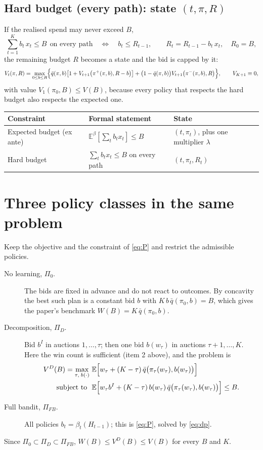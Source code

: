 \documentclass[11pt]{article}
\newcommand{\E}{\mathbb{E}}
\newcommand{\qbar}{\bar q}
\theoremstyle{remark}
\begin{document}
\subsection{Hard budget (every path): state $(t,\pi,R)$}

If the realised spend may never exceed $B$,
\[
\sum_{t=1}^Kb_t\,x_t\le B\ \ \text{on every path}
\quad\Longleftrightarrow\quad
b_t\le R_{t-1},\qquad R_t=R_{t-1}-b_t\,x_t,\quad R_0=B,
\]
the remaining budget $R$ becomes a state and the bid is capped by it:
\begin{equation}\label{eq:hard}
V_t(\pi,R)=\max_{0\le b\le R}\Bigl\{\qbar(\pi,b)\bigl[1+V_{t+1}\bigl(\pi^{+}(\pi,b),R-b\bigr)\bigr]
+\bigl(1-\qbar(\pi,b)\bigr)V_{t+1}\bigl(\pi^{-}(\pi,b),R\bigr)\Bigr\},\qquad V_{K+1}\equiv0,
\end{equation}
with value $V_1(\pi_0,B)\le V(B)$, because every policy that respects the hard budget also respects the expected one.

\begin{table}[h]
\centering\small
\begin{tabular}{@{}lll@{}}
\toprule
Constraint & Formal statement & State\\
\midrule
Expected budget (ex ante) & $\E^\beta[\sum_tb_tx_t]\le B$ & $(t,\pi_t)$, plus one multiplier $\lambda$\\
Hard budget & $\sum_tb_tx_t\le B$ on every path & $(t,\pi_t,R_t)$\\
\bottomrule
\end{tabular}
\end{table}

\section{Three policy classes in the same problem}

Keep the objective and the constraint of \eqref{eq:P} and restrict the admissible policies.
\begin{description}
\item[No learning, $\Pi_0$.] The bids are fixed in advance and do not react to outcomes. By concavity the best such
plan is a constant bid $b$ with $K\,b\,\qbar(\pi_0,b)=B$, which gives the paper's benchmark $W(B)=K\,\qbar(\pi_0,b)$.
\item[Decomposition, $\Pi_D$.] Bid $b^I$ in auctions $1,\dots,\tau$; then one bid $b(w_\tau)$ in auctions
$\tau+1,\dots,K$. Here the win count is sufficient (item 2 above), and the problem is
\begin{align*}
V^{D}(B)=\max_{\tau,\;b(\cdot)}\ &\E\Bigl[w_\tau+(K-\tau)\,\qbar\bigl(\pi_\tau(w_\tau),b(w_\tau)\bigr)\Bigr]\\
\text{subject to}\ \ &\E\Bigl[w_\tau b^I+(K-\tau)\,b(w_\tau)\,\qbar\bigl(\pi_\tau(w_\tau),b(w_\tau)\bigr)\Bigr]\le B .
\end{align*}
\item[Full bandit, $\Pi_{FB}$.] All policies $b_t=\beta_t(H_{t-1})$; this is \eqref{eq:P}, solved by \eqref{eq:dp}.
\end{description}
Since $\Pi_0\subset\Pi_D\subset\Pi_{FB}$, $W(B)\le V^{D}(B)\le V(B)$ for every $B$ and $K$.
\end{document}
